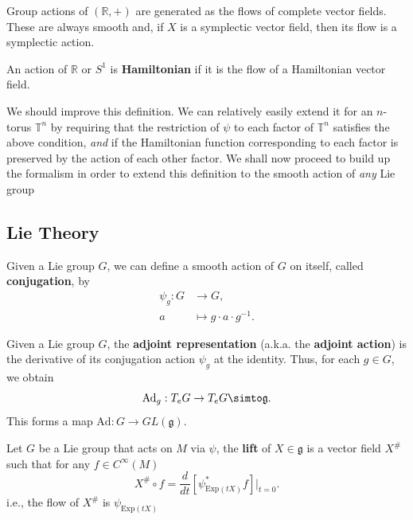\documentclass[11pt, final]{article}
\begin{document}
\begin{example}
	Group actions of $(\mathbb{R},+)$ are generated as the flows of complete vector fields. These are always smooth and, if $X$ is a symplectic vector field, then its flow is a symplectic action.
\end{example}

\begin{definition}
	An action of $\mathbb{R}$ or $S^1$ is \textbf{Hamiltonian} if it is the flow of a Hamiltonian vector field.
\end{definition}

\begin{remark}
	We should improve this definition. We can relatively easily extend it for an $n$-torus $\mathbb{T}^n$ by requiring that the restriction of $\psi$ to each factor of $\mathbb{T}^n$ satisfies the above condition, \textit{and} if the Hamiltonian function corresponding to each factor is preserved by the action of each other factor. We shall now proceed to build up the formalism in order to extend this definition to the smooth action of \textit{any} Lie group
\end{remark}

\subsection{Lie Theory}

\begin{definition}[Conjugation]
	Given a Lie group $G$, we can define a smooth action of $G$ on itself, called \textbf{conjugation}, by
		\begin{align*}
			\psi_g:	 G &\to G,\\
					a &\mapsto g \cdot a \cdot g^{-1}.
		\end{align*}
\end{definition}
\begin{definition}
	Given a Lie group $G$, the \textbf{adjoint representation} (a.k.a. the \textbf{adjoint action}) is the derivative of its conjugation action $\psi_g$ at the identity. Thus, for each $g \in G$, we obtain
		\begin{equation}
			\mathrm{Ad}_g: T_eG \to T_eG \simto \mathfrak{g}.
		\end{equation}
	This forms a map $\mathrm{Ad}: G \to GL(\mathfrak{g})$.
\end{definition}

\begin{definition}
	Let $ G $ be a Lie group that acts on $ M $ via $ \psi $, the \textbf{lift} of $ X \in \mathfrak{g} $ is a vector field $ X^\# $ such that for any $ f \in C^\infty(M) $
		\begin{equation}\label{key}
			X^\# \circ f = \frac{d}{dt} \left[ \psi^*_{\mathrm{Exp}(tX)} f \right]|_{t=0}.
		\end{equation}
	i.e., the flow of $ X^\# $ is $ \psi_{\mathrm{Exp}(tX)} $
\end{definition}
\end{document}
